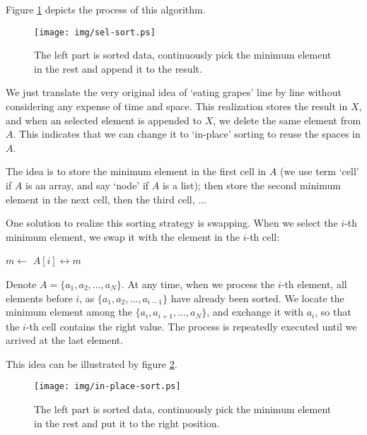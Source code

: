 \documentclass{article}
\begin{document}
Figure \ref{fig:sel-sort} depicts the process of this algorithm.

\begin{figure}[htbp]
  \centering
  \texttt{[image: img/sel-sort.ps]}
  \caption{The left part is sorted data, continuously pick the minimum element in the rest and append it to the result.}
  \label{fig:sel-sort}
\end{figure}

We just translate the very original idea of `eating grapes' line by line without
considering any expense of time and space. This realization stores the result
in $X$, and when an selected element is appended to $X$, we delete the same element
from $A$. This indicates that we can change it to `in-place' sorting to reuse
the spaces in $A$.

The idea is to store the minimum element in the first cell in $A$ (we use term `cell' if
$A$ is an array, and say `node' if $A$ is a list); then store the second minimum element
in the next cell, then the third cell, ...

One solution to realize this sorting strategy is swapping. When we select the $i$-th
minimum element, we swap it with the element in the $i$-th cell:

\begin{algorithmic}
    \State $m \gets$ 
    \State {} $A[i] \leftrightarrow m$
  \EndFor
\EndFunction
\end{algorithmic}

Denote $A = \{a_1, a_2, ..., a_N\}$. At any time, when we process the $i$-th element,
all elements before $i$, as $\{a_1, a_2, ..., a_{i-1}\}$ have already been sorted.
We locate the minimum element among the $\{a_i, a_{i+1}, ..., a_N\}$, and exchange it
with $a_i$, so that the $i$-th cell contains the right value. The process is repeatedly
executed until we arrived at the last element.

This idea can be illustrated by figure \ref{fig:in-place-sort}.

\begin{figure}[htbp]
  \centering
  \texttt{[image: img/in-place-sort.ps]}
  \caption{The left part is sorted data, continuously pick the minimum element in the rest and put it to the right position.}
  \label{fig:in-place-sort}
\end{figure}

\end{document}
